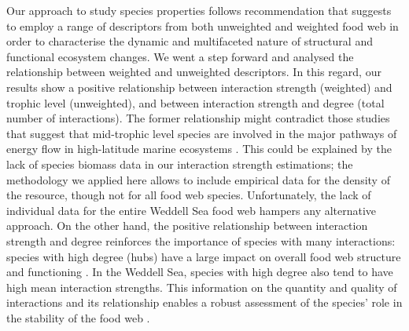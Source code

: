 \documentclass[gc, manuscript]{copernicus}
\begin{document}
Our approach to study species properties follows \citet{Kortsch2021}
recommendation that suggests to employ a range of descriptors from both
unweighted and weighted food web in order to characterise the dynamic
and multifaceted nature of structural and functional ecosystem changes.
We went a step forward and analysed the relationship between weighted
and unweighted descriptors. In this regard, our results show a positive
relationship between interaction strength (weighted) and trophic level
(unweighted), and between interaction strength and degree (total number
of interactions). The former relationship might contradict those studies
that suggest that mid-trophic level species are involved in the major
pathways of energy flow in high-latitude marine ecosystems
\citep{Pinkerton2014, Murphy2016, McCormack2020, Riccialdelli2020}. This
could be explained by the lack of species biomass data in our
interaction strength estimations; the methodology we applied here
\citep{Pawar2012} allows to include empirical data for the density of
the resource, though not for all food web species. Unfortunately, the
lack of individual data for the entire Weddell Sea food web hampers any
alternative approach. On the other hand, the positive relationship
between interaction strength and degree reinforces the importance of
species with many interactions: species with high degree (hubs) have a
large impact on overall food web structure and functioning
\citep{Dunne2002a, Kortsch2015}. In the Weddell Sea, species with high
degree also tend to have high mean interaction strengths. This
information on the quantity and quality of interactions and its
relationship enables a robust assessment of the species' role in the
stability of the food web \citep{Cirtwill2018a}.
\end{document}
